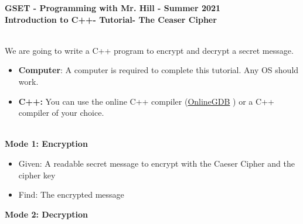 \documentclass[12pt]{article}
\newcommand{\MNUM}{4} %
\newcommand{\MNAME}{Introduction to C++} %
\newcommand{\TNAME}{The Ceaser Cipher} %
\begin{document}
\thispagestyle{plain}

\begin{center}
   {\bf \large GSET - Programming with Mr. Hill - Summer 2021} \vspace{5mm}\\
   {\bf \Large \MNAME \hspc -  Tutorial\hspc\MNUM\hspc - \TNAME}\vspace{3mm}\\
   
\end{center}


\begin{description}[labelindent=1cm]
	
	\item[\textbf{\underline{Overview:}}] \hfill \vspace{3mm}\\
	We are going to write a C++ program to encrypt and decrypt a secret message. 
	
	\item[\textbf{\underline{System Requirements:}}] \hfill \vspace{0mm}

\begin{itemize}
	\item {\bf Computer}: A computer is required to complete this tutorial. Any OS should work.
	\item {\bf C++:} You can use the online C++ compiler (\href{https://www.onlinegdb.com/online\_c++\_compiler}{OnlineGDB} ) or a C++ compiler of your choice.
\end{itemize}

	\item[\textbf{\underline{Problem Statement:}}] \hfill \vspace{0mm} \\
	{\bf Mode 1: Encryption}
	\begin{itemize}

		\item Given: A readable secret message to encrypt with the Caeser Cipher and the cipher key
		
		\item Find: The encrypted message
		 
	\end{itemize}

	{\bf Mode 2: Decryption}
	\begin{itemize}
		

\end{itemize}
\end{description}
\end{document}
